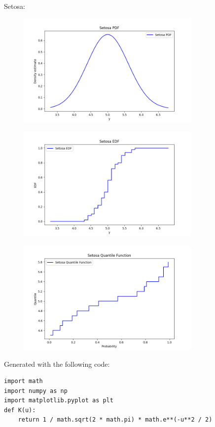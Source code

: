 \documentclass{article}
\begin{document}
\begin{enumerate}
\begin{figure}[htbp]
\end{figure}
\newpage
Setosa:
\begin{figure}[htbp]
    \centering
    \includegraphics[width=0.8\textwidth]{setosa_pdf.png}
\end{figure}
\begin{figure}[htbp]
    \centering
    \includegraphics[width=0.8\textwidth]{setosa_edf.png}
\end{figure}
\begin{figure}[htbp]
    \centering
    \includegraphics[width=0.8\textwidth]{setosa_quantile.png}
\end{figure}
\newpage 
Generated with the following code: \\
\begin{verbatim}
import math
import numpy as np
import matplotlib.pyplot as plt
def K(u):
    return 1 / math.sqrt(2 * math.pi) * math.e**(-u**2 / 2) 


\end{verbatim}
\end{enumerate}
\end{document}
